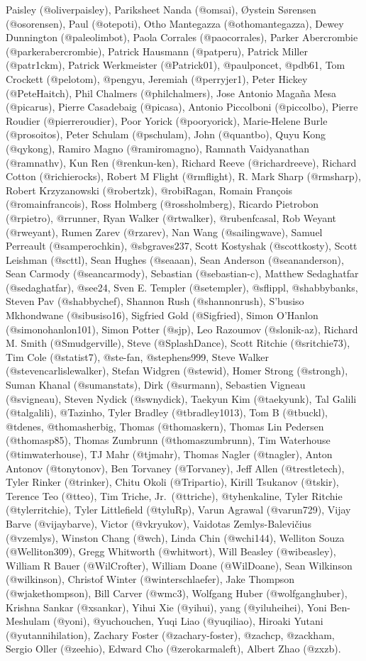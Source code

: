 \documentclass[
]{book}
\begin{document}
Paisley (@oliverpaisley), Pariksheet Nanda (@omsai), Øystein Sørensen (@osorensen), Paul (@otepoti), Otho Mantegazza (@othomantegazza), Dewey Dunnington (@paleolimbot), Paola Corrales (@paocorrales), Parker Abercrombie (@parkerabercrombie), Patrick Hausmann (@patperu), Patrick Miller (@patr1ckm), Patrick Werkmeister (@Patrick01), @paulponcet, @pdb61, Tom Crockett (@pelotom), @pengyu, Jeremiah (@perryjer1), Peter Hickey (@PeteHaitch), Phil Chalmers (@philchalmers), Jose Antonio Magaña Mesa (@picarus), Pierre Casadebaig (@picasa), Antonio Piccolboni (@piccolbo), Pierre Roudier (@pierreroudier), Poor Yorick (@pooryorick), Marie-Helene Burle (@prosoitos), Peter Schulam (@pschulam), John (@quantbo), Quyu Kong (@qykong), Ramiro Magno (@ramiromagno), Ramnath Vaidyanathan (@ramnathv), Kun Ren (@renkun-ken), Richard Reeve (@richardreeve), Richard Cotton (@richierocks), Robert M Flight (@rmflight), R. Mark Sharp (@rmsharp), Robert Krzyzanowski (@robertzk), @robiRagan, Romain François (@romainfrancois), Ross Holmberg (@rossholmberg), Ricardo Pietrobon (@rpietro), @rrunner, Ryan Walker (@rtwalker), @rubenfcasal, Rob Weyant (@rweyant), Rumen Zarev (@rzarev), Nan Wang (@sailingwave), Samuel Perreault (@samperochkin), @sbgraves237, Scott Kostyshak (@scottkosty), Scott Leishman (@scttl), Sean Hughes (@seaaan), Sean Anderson (@seananderson), Sean Carmody (@seancarmody), Sebastian (@sebastian-c), Matthew Sedaghatfar (@sedaghatfar), @see24, Sven E. Templer (@setempler), @sflippl, @shabbybanks, Steven Pav (@shabbychef), Shannon Rush (@shannonrush), S'busiso Mkhondwane (@sibusiso16), Sigfried Gold (@Sigfried), Simon O'Hanlon (@simonohanlon101), Simon Potter (@sjp), Leo Razoumov (@slonik-az), Richard M. Smith (@Smudgerville), Steve (@SplashDance), Scott Ritchie (@sritchie73), Tim Cole (@statist7), @ste-fan, @stephens999, Steve Walker (@stevencarlislewalker), Stefan Widgren (@stewid), Homer Strong (@strongh), Suman Khanal (@sumanstats), Dirk (@surmann), Sebastien Vigneau (@svigneau), Steven Nydick (@swnydick), Taekyun Kim (@taekyunk), Tal Galili (@talgalili), @Tazinho, Tyler Bradley (@tbradley1013), Tom B (@tbuckl), @tdenes, @thomasherbig, Thomas (@thomaskern), Thomas Lin Pedersen (@thomasp85), Thomas Zumbrunn (@thomaszumbrunn), Tim Waterhouse (@timwaterhouse), TJ Mahr (@tjmahr), Thomas Nagler (@tnagler), Anton Antonov (@tonytonov), Ben Torvaney (@Torvaney), Jeff Allen (@trestletech), Tyler Rinker (@trinker), Chitu Okoli (@Tripartio), Kirill Tsukanov (@tskir), Terence Teo (@tteo), Tim Triche, Jr.~(@ttriche), @tyhenkaline, Tyler Ritchie (@tylerritchie), Tyler Littlefield (@tyluRp), Varun Agrawal (@varun729), Vijay Barve (@vijaybarve), Victor (@vkryukov), Vaidotas Zemlys-Balevičius (@vzemlys), Winston Chang (@wch), Linda Chin (@wchi144), Welliton Souza (@Welliton309), Gregg Whitworth (@whitwort), Will Beasley (@wibeasley), William R Bauer (@WilCrofter), William Doane (@WilDoane), Sean Wilkinson (@wilkinson), Christof Winter (@winterschlaefer), Jake Thompson (@wjakethompson), Bill Carver (@wmc3), Wolfgang Huber (@wolfganghuber), Krishna Sankar (@xsankar), Yihui Xie (@yihui), yang (@yiluheihei), Yoni Ben-Meshulam (@yoni), @yuchouchen, Yuqi Liao (@yuqiliao), Hiroaki Yutani (@yutannihilation), Zachary Foster (@zachary-foster), @zachcp, @zackham, Sergio Oller (@zeehio), Edward Cho (@zerokarmaleft), Albert Zhao (@zxzb).
\end{document}

